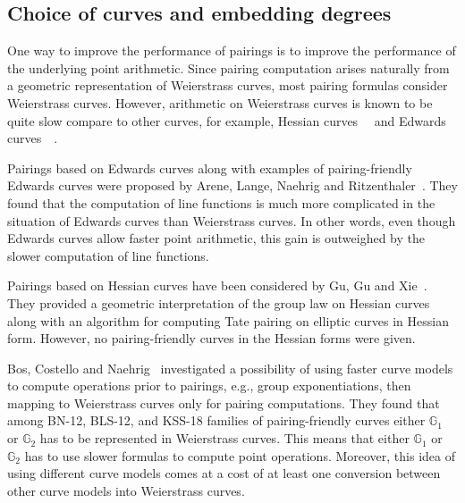 
\subsection{Choice of curves and embedding degrees}

One way to improve the performance of pairings is
to improve the performance of the underlying point arithmetic.
Since pairing computation arises naturally from a geometric representation of Weierstrass curves,
most pairing formulas consider Weierstrass curves.
However, arithmetic on Weierstrass curves is known to be quite slow compare to other curves,
for example, Hessian curves~\cite{2001/smart}~\cite{2001/joye} and
Edwards curves~\cite{2007/edwards}~\cite{2007/bernstein-newelliptic}.

Pairings based on Edwards curves
along with examples of pairing-friendly Edwards curves
were proposed by Arene, Lange, Naehrig and Ritzenthaler~\cite{2009/fastertate}.
They found that the computation of line functions is much more complicated in the situation of Edwards curves than Weierstrass curves.
In other words,
even though Edwards curves allow faster point arithmetic,
this gain is outweighed by the slower computation of line functions.

Pairings based on Hessian curves have been considered by Gu, Gu and Xie~\cite{2010/Gu}.
They provided a geometric interpretation of the group law on Hessian curves
along with an algorithm for computing Tate pairing on elliptic curves in Hessian form.
However, no pairing-friendly curves in the Hessian forms were given.

Bos, Costello and Naehrig~\cite{2013/bos-pairing} investigated a possibility of
using faster curve models to compute operations prior to pairings, e.g., group exponentiations,
then mapping to Weierstrass curves only for pairing computations.
They found that among BN-12, BLS-12, and KSS-18 families of pairing-friendly curves
either $\mathbb{G}_1$ or $\mathbb{G}_2$ has to be represented in Weierstrass curves.
This means that either $\mathbb{G}_1$ or $\mathbb{G}_2$ has to use slower formulas to compute point operations.
Moreover, this idea of using different curve models comes at a cost of at least one conversion
between other curve models into Weierstrass curves.

